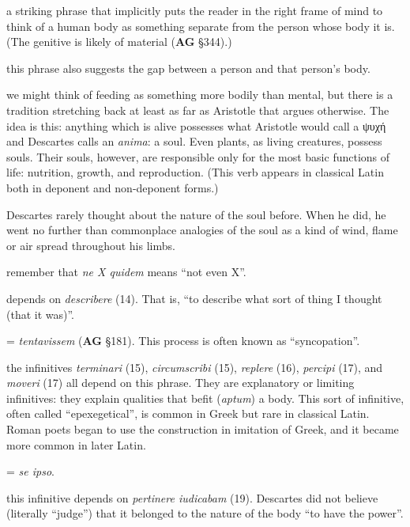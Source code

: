 \prenotes

 a striking phrase that implicitly puts the reader in the right frame of mind to think of a human body as something separate from the person whose body it is. (The genitive is likely of material (\textbf{AG} §344).)

 this phrase also suggests the gap between a person and that person's body.

 we might think of feeding as something more bodily than mental, but there is a tradition stretching back at least as far as Aristotle that argues otherwise. The idea is this: anything which is alive possesses what Aristotle would call a ψυχή and Descartes calls an \textit{anima}: a soul. Even plants, as living creatures, possess souls. Their souls, however, are responsible only for the most basic functions of life: nutrition, growth, and reproduction. (This verb appears in classical Latin both in deponent and non-deponent forms.)

 Descartes rarely thought about the nature of the soul before. When he did, he went no further than commonplace analogies of the soul as a kind of wind, flame or air spread throughout his limbs.

 remember that \textit{ne X quidem} means ``not even X''.

 depends on \textit{describere} (14). That is, ``to describe what sort of thing I thought (that it was)''.

 = \textit{tentavissem} (\textbf{AG} §181). This process is often known as ``syncopation''.

 the infinitives \textit{terminari} (15), \textit{circumscribi} (15), \textit{replere} (16), \textit{percipi} (17), and \textit{moveri} (17) all depend on this phrase. They are explanatory or limiting infinitives: they explain qualities that befit (\textit{aptum}) a body. This sort of infinitive, often called ``epexegetical'', is common in Greek but rare in classical Latin. Roman poets began to use the construction in imitation of Greek, and it became more common in later Latin.

 = \textit{se ipso}.

 this infinitive depends on \textit{pertinere iudicabam} (19). Descartes did not believe (literally ``judge'') that it belonged to the nature of the body ``to have the power''.

